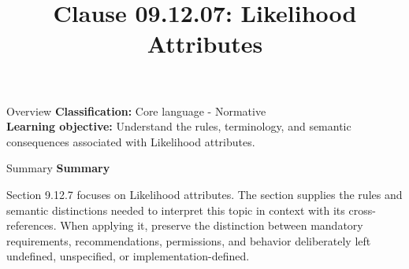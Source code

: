 \documentclass[10pt,letterpaper]{article}
\title{Clause 09.12.07: Likelihood Attributes}
\author{}
\date{}
\begin{document}
\maketitle
\begin{CornellOverviewBox}{Overview}
\textbf{Classification:} Core language - Normative\\[2pt]
\textbf{Learning objective:} Understand the rules, terminology, and semantic consequences associated with Likelihood attributes.
\end{CornellOverviewBox}\begin{CornellSummaryBox}{Summary}
{\sffamily\bfseries\color{Accent} Summary}\par\vspace{3pt}Section 9.12.7 focuses on Likelihood attributes. The section supplies the rules and semantic distinctions needed to interpret this topic in context with its cross-references. When applying it, preserve the distinction between mandatory requirements, recommendations, permissions, and behavior deliberately left undefined, unspecified, or implementation-defined.
\end{CornellSummaryBox}
\end{document}
